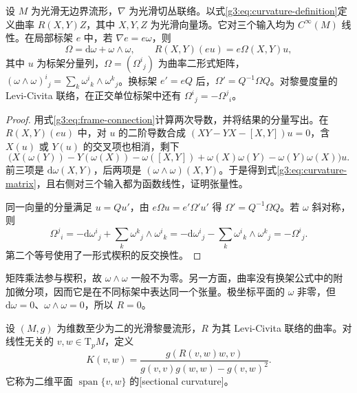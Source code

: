 \begin{proposition}\label{g3:prop:curvature-form}
	设 \(M\) 为光滑无边界流形，\(\nabla\) 为光滑切丛联络。以式\eqref{g3:eq:curvature-definition}定义曲率 \(R(X,Y)Z\)，其中 \(X,Y,Z\) 为光滑向量场。它对三个输入均为 \(C^\infty(M)\) 线性。在局部标架 \(e\) 中，若 \(\nabla e=e\omega\)，则
	\begin{equation}\label{g3:eq:curvature-matrix}
		\Omega=\mathrm{d}\omega+\omega\wedge\omega,
		\qquad
		R(X,Y)(eu)=e\Omega(X,Y)u,
	\end{equation}
	其中 \(u\) 为标架分量列，\(\Omega=(\Omega^i{}_j)\) 为曲率二形式矩阵，\((\omega\wedge\omega)^i{}_j=\sum_k\omega^i{}_k\wedge\omega^k{}_j\)。换标架 \(e'=eQ\) 后，\(\Omega'=Q^{-1}\Omega Q\)。对黎曼度量的 Levi-Civita 联络，在正交单位标架中还有 \(\Omega^i{}_j=-\Omega^j{}_i\)。
\end{proposition}
\begin{proof}
	用式\eqref{g3:eq:frame-connection}计算两次导数，并将结果的分量写出。在 \(R(X,Y)(eu)\) 中，对 \(u\) 的二阶导数合成 \((XY-YX-[X,Y])u=0\)，含 \(X(u)\) 或 \(Y(u)\) 的交叉项也相消，剩下
	\[
		\bigl(X(\omega(Y))-Y(\omega(X))-\omega([X,Y])
		+\omega(X)\omega(Y)-\omega(Y)\omega(X)\bigr)u.
	\]
	前三项是 \(\mathrm{d}\omega(X,Y)\)，后两项是 \((\omega\wedge\omega)(X,Y)\)。于是得到式\eqref{g3:eq:curvature-matrix}，且右侧对三个输入都为函数线性，证明张量性。

	同一向量的分量满足 \(u=Qu'\)，由 \(e\Omega u=e'\Omega'u'\) 得 \(\Omega'=Q^{-1}\Omega Q\)。若 \(\omega\) 斜对称，则
	\[
		\Omega^j{}_i
		=-\mathrm{d}\omega^i{}_j
		+\sum_k\omega^k{}_j\wedge\omega^i{}_k
		=-\mathrm{d}\omega^i{}_j-\sum_k\omega^i{}_k\wedge\omega^k{}_j
		=-\Omega^i{}_j.
	\]
	第二个等号使用了一形式楔积的反交换性。
\end{proof}

矩阵乘法参与楔积，故 \(\omega\wedge\omega\) 一般不为零。另一方面，曲率没有换架公式中的附加微分项，因而它是在不同标架中表达同一个张量。极坐标平面的 \(\omega\) 非零，但 \(\mathrm{d}\omega=0\)、\(\omega\wedge\omega=0\)，所以 \(R=0\)。

\begin{definition}\label{g3:def:sectional-curvature}
	设 \((M,g)\) 为维数至少为二的光滑黎曼流形，\(R\) 为其 Levi-Civita 联络的曲率。对线性无关的 \(v,w\in\mathrm{T}_pM\)，定义
	\begin{equation}\label{g3:eq:sectional-curvature}
		K(v,w)=\frac{g(R(v,w)w,v)}{g(v,v)g(w,w)-g(v,w)^2}.
	\end{equation}
	它称为二维平面 \(\operatorname{span}\{v,w\}\) 的[sectional curvature]。
\end{definition}

